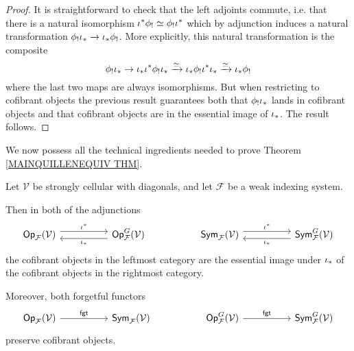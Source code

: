 \documentclass[a4paper,10pt]{article}%
\begin{document}
\begin{proof}
	It is straightforward to check that the left adjoints commute, i.e. that there is a natural isomorphism 
	$\iota^{\**} \phi_{!} \simeq \phi_{!} \iota^{\**}$
which by adjunction induces a natural transformation
	$\phi_! \iota_{\**} \to \iota_{\**} \phi_!$.
More explicitly, this natural transformation is the composite
\[\phi_! \iota_{\**} \to 
\iota_{\**} \iota^{\**} \phi_! \iota_{\**} \xrightarrow{\simeq}
\iota_{\**} \phi_! \iota^{\**} \iota_{\**} \xrightarrow{\simeq}
\iota_{\**} \phi_!
\]
where the last two maps are always isomorphisms. But when restricting to cofibrant objects the previous result guarantees both that $\phi_! \iota_{\**}$ lands in cofibrant objects and that cofibrant objects are in the essential image of $\iota_{\**}$. The result follows.
\end{proof}


We now possess all the technical ingredients needed to 
prove Theorem \ref{MAINQUILLENEQUIV THM}.

\begin{lemma}\label{MAINLEM LEM}
	Let $\mathcal{V}$ be strongly cellular with diagonals,
        and let $\mathcal{F}$ be a weak indexing system.
	
Then in both of the adjunctions
\begin{equation}\label{COFADJ2 EQ}
\begin{tikzcd}[column sep =5em]
	\mathsf{Op}_{\mathcal{F}}(\mathcal{V}) \ar[shift left=1.5]{r}{\iota^{\**}} 
&
	\mathsf{Op}^G_{\mathcal{F}}(\mathcal{V})
	\ar[shift left=1.5]{l}{\iota_{\**}}
&
	\mathsf{Sym}_{\mathcal{F}}(\mathcal{V}) \ar[shift left=1.5]{r}{\iota^{\**}} 
&
	\mathsf{Sym}^G_{\mathcal{F}}(\mathcal{V})
	\ar[shift left=1.5]{l}{\iota_{\**}}	
\end{tikzcd}
\end{equation}	
the cofibrant objects in the leftmost category are the essential image under $\iota_{\**}$ of the 
cofibrant objects in the rightmost category.

Moreover, both forgetful functors 
\begin{equation}\label{FGTFUNC EQ}
\begin{tikzcd}[column sep =5em]
	\mathsf{Op}_{\mathcal{F}}(\mathcal{V}) \ar{r}{\mathsf{fgt}} 
&
	\mathsf{Sym}_{\mathcal{F}}(\mathcal{V})
&
	\mathsf{Op}^G_{\mathcal{F}}(\mathcal{V})
	 \ar{r}{\mathsf{fgt}}
&
	\mathsf{Sym}^G_{\mathcal{F}}(\mathcal{V})
\end{tikzcd}
\end{equation}
preserve cofibrant objects.
\end{lemma}
\end{document}
